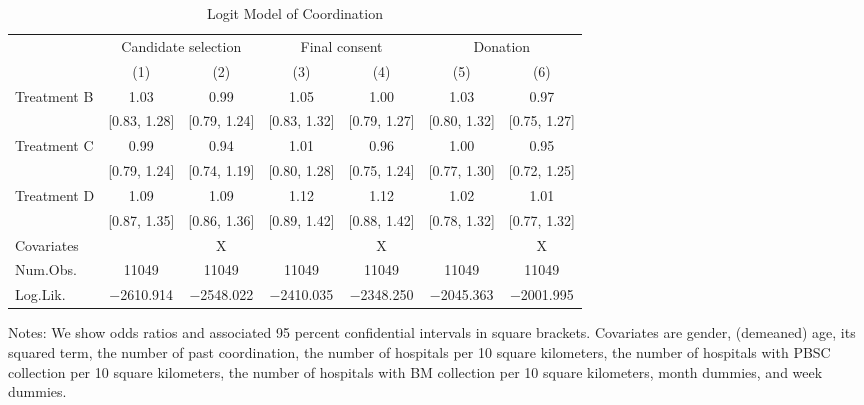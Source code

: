 \documentclass[12pt, a4paper]{article}
\begin{document}
\begin{table}[H]

\caption{\label{tab:coordinate-logit}Logit Model of Coordination}
\centering
\fontsize{9}{11}\selectfont
\begin{threeparttable}
\begin{tabular}[t]{lcccccc}
\toprule
\multicolumn{1}{c}{ } & \multicolumn{2}{c}{Candidate selection} & \multicolumn{2}{c}{Final consent} & \multicolumn{2}{c}{Donation} \\
\cmidrule(l{3pt}r{3pt}){2-3} \cmidrule(l{3pt}r{3pt}){4-5} \cmidrule(l{3pt}r{3pt}){6-7}
  & (1) & (2) & (3) & (4) & (5) & (6)\\
\midrule
Treatment B & \num{1.03} & \num{0.99} & \num{1.05} & \num{1.00} & \num{1.03} & \num{0.97}\\
 & {}[\num{0.83}, \num{1.28}] & {}[\num{0.79}, \num{1.24}] & {}[\num{0.83}, \num{1.32}] & {}[\num{0.79}, \num{1.27}] & {}[\num{0.80}, \num{1.32}] & {}[\num{0.75}, \num{1.27}]\\
Treatment C & \num{0.99} & \num{0.94} & \num{1.01} & \num{0.96} & \num{1.00} & \num{0.95}\\
 & {}[\num{0.79}, \num{1.24}] & {}[\num{0.74}, \num{1.19}] & {}[\num{0.80}, \num{1.28}] & {}[\num{0.75}, \num{1.24}] & {}[\num{0.77}, \num{1.30}] & {}[\num{0.72}, \num{1.25}]\\
Treatment D & \num{1.09} & \num{1.09} & \num{1.12} & \num{1.12} & \num{1.02} & \num{1.01}\\
 & {}[\num{0.87}, \num{1.35}] & {}[\num{0.86}, \num{1.36}] & {}[\num{0.89}, \num{1.42}] & {}[\num{0.88}, \num{1.42}] & {}[\num{0.78}, \num{1.32}] & {}[\num{0.77}, \num{1.32}]\\
\midrule
Covariates &  & X &  & X &  & X\\
Num.Obs. & \num{11049} & \num{11049} & \num{11049} & \num{11049} & \num{11049} & \num{11049}\\
Log.Lik. & \num{-2610.914} & \num{-2548.022} & \num{-2410.035} & \num{-2348.250} & \num{-2045.363} & \num{-2001.995}\\
\bottomrule
\end{tabular}
\begin{tablenotes}
\item Notes: We show odds ratios and associated 95 percent confidential intervals in square brackets. Covariates are gender, (demeaned) age, its squared term, the number of past coordination, the number of hospitals per 10 square kilometers, the number of hospitals with PBSC collection per 10 square kilometers, the number of hospitals with BM collection per 10 square kilometers, month dummies, and week dummies.
\end{tablenotes}
\end{threeparttable}
\end{table}
\end{document}

